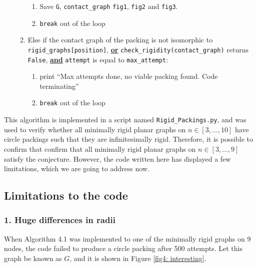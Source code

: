 \begin{flushleft}
\begin{enumerate}
\begin{enumerate}
        \begin{enumerate}
            \item Save \texttt{G}, \texttt{contact\_graph} \texttt{fig1}, \texttt{fig2} and \texttt{fig3}.
            \vspace{-1mm}
            \item \texttt{break} out of the loop
        \end{enumerate}
        \vspace{-1mm}
        \item Else if the contact graph of the packing is not isomorphic to \texttt{rigid\_graphs[position]}, \textbf{\underline{or}} \texttt{check\_rigidity(contact\_graph)} returns \texttt{False}, \textbf{\underline{and}} \texttt{attempt} is equal to \texttt{max\_attempt}:
        \begin{enumerate}
            \item print ``Max attempts done, no viable packing found. Code terminating''
            \vspace{-1mm}
            \item \texttt{break} out of the loop
        \end{enumerate}
    \end{enumerate}
\end{enumerate}
\end{flushleft}

\begin{flushleft}
This algorithm is implemented in a script named \texttt{Rigid\_Packings.py}, and was used to verify whether all minimally rigid planar graphs on $n \in [3, \hdots, 10]$ have circle packings such that they are infinitesimally rigid. Therefore, it is possible to confirm that confirm that all minimally rigid planar graphs on $n \in [3, \hdots, 9]$ satisfy the conjecture. However, the code written here has displayed a few limitations, which we are going to address now.
\end{flushleft}

\subsection{Limitations to the code}

\subsubsection{1. Huge differences in radii}

\begin{flushleft}
When Algorithm 4.1 was implemented to one of the minimally rigid graphs on 9 nodes, the code failed to produce a circle packing after 500 attempts. Let this graph be known as $G$, and it is shown in Figure \ref{fig4: interesting}.
\end{flushleft}

